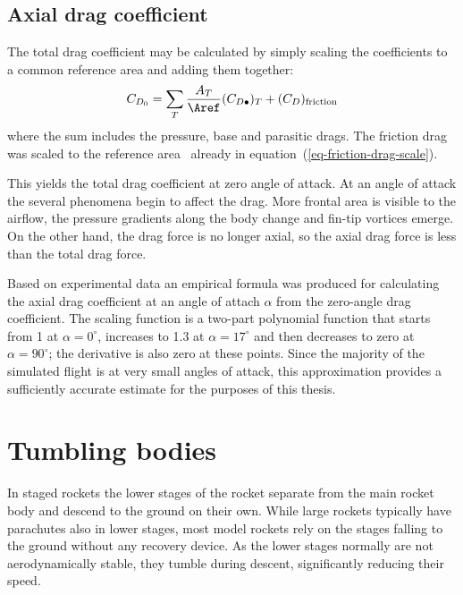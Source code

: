 \subsection{Axial drag coefficient}
\label{sec-axial-drag}

The total drag coefficient may be calculated by simply scaling the
coefficients to a common reference area and adding them together:
%
\begin{equation}
C_{D_0} = \sum_T \frac{A_T}{\Aref}(C_{D\bullet})_T
 + (C_D)_{\rm friction}
\end{equation}
%
where the sum includes the pressure, base and parasitic drags.  The
friction drag was scaled to the reference area \Aref\ already in
equation~(\ref{eq-friction-drag-scale}).

This yields the total drag coefficient at zero angle of attack.  At an
angle of attack the several phenomena begin to affect the drag.
More frontal area is visible to the airflow, the pressure gradients
along the body change and fin-tip vortices emerge.  On the other hand,
the drag force is no longer axial, so the axial drag force is less
than the total drag force.

Based on experimental data an empirical formula was produced for
calculating the axial drag coefficient at an angle of attach $\alpha$
from the zero-angle drag coefficient.  The scaling function is a
two-part polynomial function that starts from 1 at $\alpha=0^\circ$,
increases to 1.3 at $\alpha=17^\circ$ and then decreases to zero at
$\alpha=90^\circ$; the derivative is also zero at these points.  Since
the majority of the simulated flight is at very small angles of
attack, this approximation provides a sufficiently accurate estimate
for the purposes of this thesis.


\section{Tumbling bodies}
\label{sec-tumbling-bodies}

%
%

In staged rockets the lower stages of the rocket separate from the
main rocket body and descend to the ground on their own.  While large
rockets typically have parachutes also in lower stages, most model
rockets rely on the stages falling to the ground without any recovery
device.  As the lower stages normally are not aerodynamically stable,
they tumble during descent, significantly reducing their speed.

